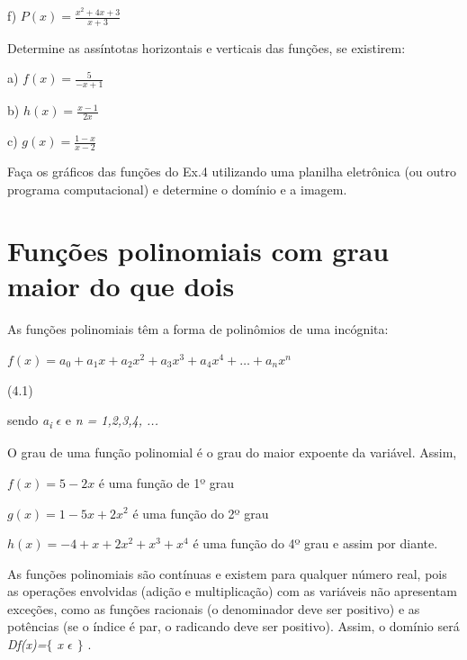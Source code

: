 \begin{exercicios}
\begin{multicols}{3}
	f)  \( P \left( x \right) =\frac{x^{2}+4x+3}{x+3} \)
\end{multicols}

	\exitem{} Determine as assíntotas horizontais e verticais das funções, se existirem:
\begin{multicols}{3}
a)  \( f \left( x \right) =\frac{5}{-x+1} \)

b)  \( h \left( x \right) =\frac{x-1}{2x} \)

c)  \( g \left( x \right) =\frac{1-x}{x-2} \) 
\end{multicols}
	\exitem{} Faça os gráficos das funções do Ex.4 utilizando uma planilha eletrônica (ou outro programa computacional) e determine o domínio e a imagem.

\end{exercicios}

\section{Funções polinomiais com grau maior do que dois}
\begin{caixa}
\begin{tdefinicao}

As funções polinomiais têm a forma de polinômios de uma incógnita:

 \( f \left( x \right) =a_{0}+a_{1}x+a_{2}x^{2}+a_{3}x^{3}+a_{4}x^{4}+ \ldots +a_{n}x^{n} \) \begin{flushright}(4.1)\end{flushright}

sendo \textit{a\textsubscript{i}} $ \epsilon $ e \textit{n = 1,2,3,4, ...}
\end{tdefinicao}
\end{caixa}
O grau de uma função polinomial é o grau do maior expoente da variável. Assim,

 \( f \left( x \right) =5-2x \) é uma função de 1º grau

 \( g \left( x \right) = 1-5x+2x^{2} \) é uma função do 2º grau

 \( h \left( x \right) = -4+x+2x^{2}+x^{3}+x^{4} \) é uma função do 4º grau e assim por diante.

\begin{justify}
\quad As funções polinomiais são contínuas e existem para qualquer número real, pois as operações envolvidas (adição e multiplicação) com as variáveis não apresentam exceções, como as funções racionais (o denominador deve ser positivo) e as potências (se o índice é par, o radicando deve ser positivo). Assim, o domínio será \textit{Df(x)=$ \{ $ x $ \epsilon $  \textbf{ }$ \} $ }. 
\end{justify}

